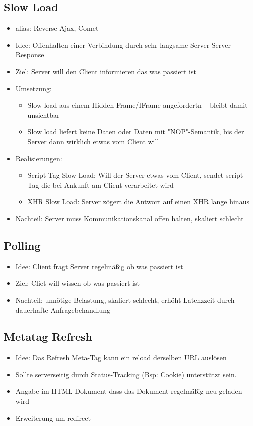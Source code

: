 \documentclass{article} %
\begin{document}
	\subsection{Slow Load}
	\begin{itemize}
		\item alias: Reverse Ajax, Comet
		\item Idee: Offenhalten einer Verbindung durch sehr langsame Server
		Server-Response
		\item Ziel: Server will den Client informieren das was passiert ist
		\item Umsetzung: 
		\begin{itemize}
			\item Slow load aus einem Hidden Frame/IFrame angefordertn – bleibt damit unsichtbar
			\item Slow load liefert keine Daten oder Daten mit "NOP"-Semantik, bis der Server dann wirklich etwas vom Client will
		\end{itemize}
		\item Realisierungen:
		\begin{itemize}
			\item Script-Tag Slow Load: Will der Server etwas vom Client, sendet script-Tag die bei Ankunft am Client verarbeitet wird
			\item XHR Slow Load: Server zögert die Antwort auf einen XHR lange hinaus
		\end{itemize}
		\item Nachteil: Server muss Kommunikationskanal offen halten, skaliert schlecht
	\end{itemize}
	\subsection{Polling}
	\begin{itemize}
		\item Idee: Client fragt Server regelmäßig ob was passiert ist
		\item Ziel: Cliet will wissen ob was passiert ist
		\item Nachteil: unnötige Belastung, skaliert schlecht, erhöht Latenzzeit durch dauerhafte Anfragebehandlung
	\end{itemize}
	\subsection{Metatag Refresh}
	\begin{itemize}
		\item Idee: Das Refresh Meta-Tag kann ein reload derselben URL auslösen
		\item Sollte serverseitig durch Status-Tracking (Bsp: Cookie) unterstützt sein.
		\item Angabe im HTML-Dokument dass das Dokument regelmäßig neu geladen wird
		\item Erweiterung um redirect
	\end{itemize}
	
\end{document}
